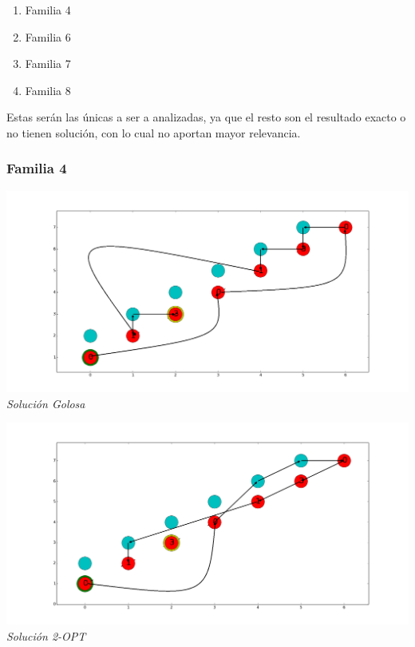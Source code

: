 \begin{enumerate}
\item Familia 4
\item Familia 6
\item Familia 7
\item Familia 8
\end{enumerate}

Estas ser\'an las únicas a ser a analizadas, ya que el resto son el resultado exacto o no tienen soluci\'on, con lo cual no aportan mayor relevancia.
 
\subsubsection*{Familia 4}

\vspace*{0.3cm} \vspace*{0.3cm}
  \begin{center}
 \includegraphics[scale=0.3]{./EJ4/fam4goloso.png}\\
 {            \textit{Soluci\'on Golosa}}
  \end{center}
  \vspace*{0.3cm}

\vspace*{0.3cm} \vspace*{0.3cm}
  \begin{center}
 \includegraphics[scale=0.3]{./EJ4/fam42opt.png}\\
 {            \textit{Soluci\'on 2-OPT}}
  \end{center}
  \vspace*{0.3cm}

